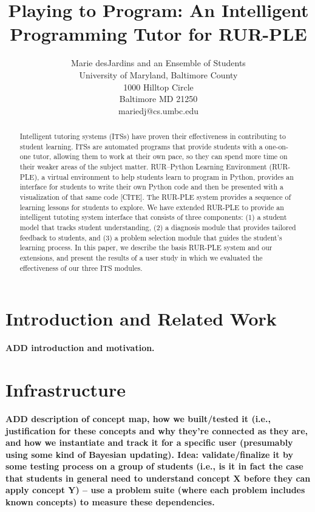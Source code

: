 \documentclass[twocolumn]{article}
\title{Playing to Program:  An Intelligent Programming Tutor for RUR-PLE}
\author{Marie desJardins and an Ensemble of Students \\
University of Maryland, Baltimore County \\ 
1000 Hilltop Circle \\
Baltimore MD  21250 \\
mariedj@cs.umbc.edu
}
\newcommand{\fix}[1]{{\bf #1}}
\begin{document}
\maketitle

\begin{abstract}
Intelligent tutoring systems (ITSs) have proven their effectiveness in
contributing to student learning.  ITSs are automated programs
that provide students with a one-on-one tutor, allowing them to work
at their own pace, so they can spend more time on their weaker areas
of the subject matter.  RUR--Python Learning Environment (RUR-PLE), a
virtual environment to help 
students learn to program in Python, provides an interface for
students to write their own Python code and then be presented with a
visualization of that same code [CITE].  
The RUR-PLE system provides a sequence of learning lessons for
students to explore.  We have extended RUR-PLE to provide an
intelligent tutoting system interface that consists of three
components:  (1) a
student model that tracks student understanding, (2) a diagnosis module
that provides tailored feedback to students, and (3) a problem selection
module that guides the student's learning process.  In this paper, we
describe the basis RUR-PLE system and our extensions, and present the
results of a user study in which we evaluated the effectiveness of our
three ITS modules.
\end{abstract}

\section{Introduction and Related Work}
\label{sec:intro}

\fix{ADD introduction and motivation.}

\section{Infrastructure}
\label{sec:student-model}

\fix{ADD description of concept map, how we built/tested it 
(i.e., justification for these concepts and why they're
connected as they are, and how we instantiate and track it for a
specific user (presumably using some kind of Bayesian updating).  
Idea:  validate/finalize it by some testing process on
a group of students (i.e., is it in fact the case that students in
general need to understand concept X before they can apply concept Y)
-- use a problem suite (where each problem includes known concepts)
to measure these dependencies.} 
\end{document}
